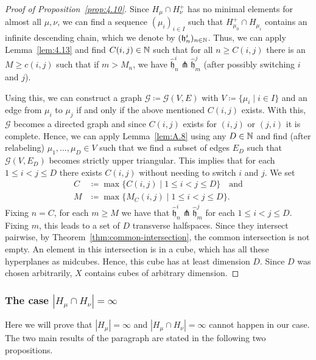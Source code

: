 \begin{proof}[Proof of Proposition~\ref{prop:4.10}]
  Since \(H_\mu \cap H_\nu^+\) has no minimal elements for almost all \(\mu, \nu\), we can find a sequence \((\mu_i)_{i \in I}\) such that \(H_{\mu_0}^+ \cap H_{\mu_i}\) contains an infinite descending chain, which we denote by \((\mathfrak{h}^i_n)_{n \in \mathbb{N}}\). Thus, we can apply Lemma~\ref{lem:4.13} and find \(C(i,j) \in \mathbb{N}\) such that for all \(n \geq C(i,j)\) there is an \(M \geq c(i,j)\) such that if \(m > M_n\), we have \(\mathfrak{\hat h}_n^i \pitchfork \mathfrak{\hat h}_m^j\) (after possibly switching \(i\) and \(j\)).

  Using this, we can construct a graph \(\mathcal{G} \coloneqq \mathcal{G}(V,E)\) with \(V \coloneqq \{\mu_i \mid i \in I\}\) and an edge from \(\mu_i\) to \(\mu_j\) if and only if the above mentioned \(C(i,j)\) exists. With this, \(\mathcal{G}\) becomes a directed graph and since \(C(i,j)\) exists for \((i,j)\) or \((j,i)\) it is complete. Hence, we can apply Lemma~\ref{lem:A.8} using any \(D \in \mathbb{N}\) and find (after relabeling) \(\mu_1, \dots, \mu_D \in V\) such that we find a subset of edges \(E_D\) such that \(\mathcal{G}(V,E_D)\) becomes strictly upper triangular. This implies that for each \(1\leq i < j \leq D\) there exists \(C(i,j)\) without needing to switch \(i\) and \(j\). We set
  \begin{align*}
    C &\coloneqq \max\{C(i,j) \mid 1 \leq i < j \leq D\} \quad \text{and}\\
    M &\coloneqq \max\{M_C(i,j) \mid 1 \leq i < j \leq D\}.
  \end{align*}
  Fixing \(n = C\), for each \(m \geq M\) we have that \(\mathfrak{\hat h}_n^i \pitchfork \mathfrak{\hat h}_m^j\) for each \(1 \leq i < j \leq D\). Fixing \(m\), this leads to a set of \(D\) transverse halfspaces. Since they intersect pairwise,  by Theorem~\ref{thm:common-intersection}, the common intersection is not empty. An element in this intersection is in a cube, which has all these hyperplanes as midcubes. Hence, this cube has at least dimension \(D\). Since \(D\) was chosen arbitrarily, \(X\) contains cubes of arbitrary dimension.
\end{proof}

\subsubsection{The case \(|H_\mu \cap H_\nu| = \infty\)}
\label{sec:M=infty}

Here we will prove that \(|H_\mu| = \infty\) and \(|H_\mu \cap H_\nu| = \infty\) cannot happen in our case. The two main results of the paragraph are stated in the following two propositions.

